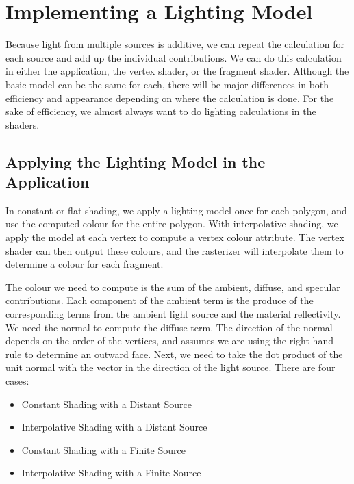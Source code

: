 \documentclass[../COS3712_Notes.tex]{subfiles}
\begin{document}
    \section{Implementing a Lighting Model}
      Because light from multiple sources is additive, we can repeat the calculation for each
      source and add up the individual contributions.
      We can do this calculation in either the application, the vertex shader, or the
      fragment shader.
      Although the basic model can be the same for each, there will be major differences
      in both efficiency and appearance depending on where the calculation is done.
      For the sake of efficiency, we almost always want to do lighting calculations in the
      shaders.

      \subsection{Applying the Lighting Model in the Application}
        In constant or flat shading, we apply a lighting model once for each polygon,
        and use the computed colour for the entire polygon.
        With interpolative shading, we apply the model at each vertex to compute a vertex
        colour attribute.
        The vertex shader can then output these colours, and the rasterizer will interpolate
        them to determine a colour for each fragment.

        The colour we need to compute is the sum of the ambient, diffuse, and specular contributions.
        Each component of the ambient term is the produce of the corresponding terms from the
        ambient light source and the material reflectivity.
        We need the normal to compute the diffuse term.
        The direction of the normal depends on the order of the vertices,
        and assumes we are using the right-hand rule to determine an outward face.
        Next, we need to take the dot product of the unit normal with the vector in the direction
        of the light source.
        There are four cases:
        \begin{itemize}[nosep]
          \item Constant Shading with a Distant Source
          \item Interpolative Shading with a Distant Source
          \item Constant Shading with a Finite Source
          \item Interpolative Shading with a Finite Source
        \end{itemize}
\end{document}
